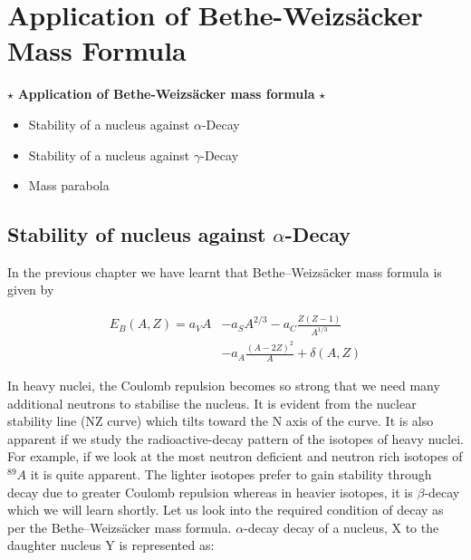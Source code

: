 \chapter{{Application of Bethe-Weizsäcker Mass Formula}}

    \begin{tcolorbox} [colframe=blue!10!black,colback=yellow!29.05!white,arc=1em,fonttitle=\bfseries,title=\textit{Key Objective:}, width = \textwidth]
        $\star$ \textbf{Application of Bethe-Weizsäcker mass formula} $\star$
        \begin{itemize}
            \item Stability of a nucleus against $\alpha$-Decay 
            \item Stability of a nucleus against $\gamma$-Decay 
            \item  Mass parabola 
        \end{itemize}
    \end{tcolorbox}
    
\pagebreak\section{Stability of nucleus against $\alpha$-Decay}
    In the previous chapter we have learnt that Bethe–Weizsäcker mass formula is given by
    
     \begin{equation}
                \begin{split}
                    E_B(A,Z) =a_VA &-a_SA^{2/3} -a_C\frac{Z(Z-1)}{A^{1/3}}\\
                                    & - a_A\frac{(A-2Z)^2}{A} + \delta(A, Z)
                \end{split}
      \end{equation}    
    \par In heavy nuclei, the Coulomb repulsion becomes so strong that we need many additional
neutrons to stabilise the nucleus. It is evident from the nuclear stability line (NZ curve) which tilts
toward the N axis of the curve. It is also apparent if we study the radioactive-decay pattern of the isotopes of heavy nuclei. For
example, if we look at the most
neutron deficient and neutron rich
isotopes of
${}^{89}A$  it is quite apparent. The lighter isotopes prefer to gain stability through
decay due to greater Coulomb
repulsion whereas in heavier
isotopes, it is $\beta$-decay  which we
will learn shortly. Let us look into
the required condition of decay
as per the Bethe–Weizsäcker mass
formula.
$\alpha$-decay  decay of a nucleus, X to the daughter nucleus Y is represented as:


